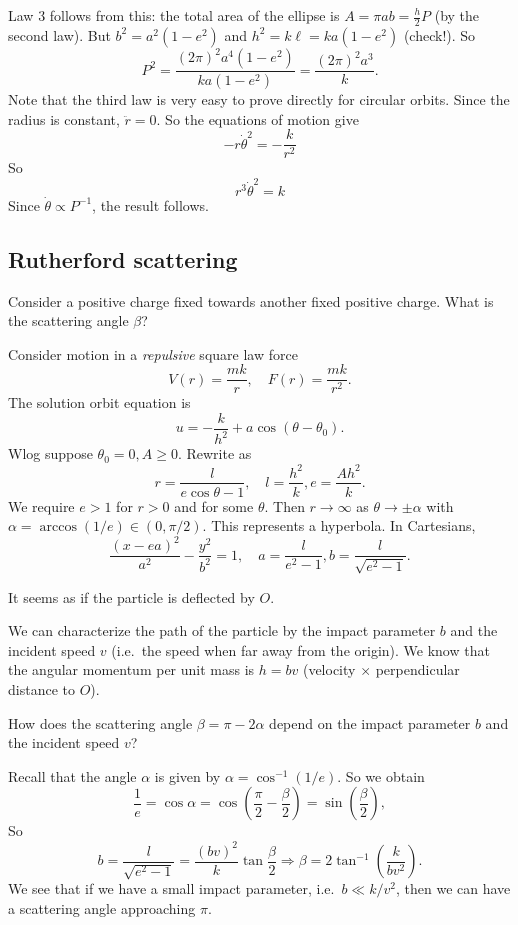 Law 3 follows from this: the total area of the ellipse is $A = \pi ab = \frac{h}{2}P$ (by the second law). But $b^2 = a^2( 1 - e^2)$ and $h^2 = k\ell = ka(1 - e^2)$ (check!). So
\[
  P^2 = \frac{(2\pi)^2a^4(1 - e^2)}{ka(1 - e^2)} = \frac{(2\pi)^2 a^3}{k}.
\]
Note that the third law is very easy to prove directly for circular orbits. Since the radius is constant, $\ddot{r} = 0$. So the equations of motion give
\[
  -r \dot{\theta}^2 = -\frac{k}{r^2}
\]
So
\[
  r^3 \dot{\theta}^2 = k
\]
Since $\dot{\theta}\propto P^{-1}$, the result follows.
\subsection{Rutherford scattering}

Consider a positive charge fixed towards another fixed positive charge. What is the scattering angle $ \beta $?

Consider motion in a \textit{repulsive} square law force
\[
    V(r) = \frac{mk}{r},\quad F(r) = \frac{mk}{r^2}.
\]
The solution orbit equation is 
\[
    u = -\frac{k}{h^2}+ a \cos (\theta-\theta_0).
\]
Wlog suppose $ \theta_0=0,A\ge 0 $. Rewrite as 
\[
    r = \frac{l}{e\cos \theta-1 },\quad l=\frac{h^2}{k},e=\frac{Ah^2}{k}.
\]
We require $ e>1 $ for $r>0$ and for some $ \theta $. Then $ r\to \infty $ as $ \theta\to \pm \alpha $ with $ \alpha=\arccos (1/e)\in (0,\pi/2) $. This represents a hyperbola. In Cartesians,
\[
    \frac{(x-ea)^2}{a^2}-\frac{y^2}{b^2}=1,\quad a=\frac{l}{e^2-1},b=\frac{l}{\sqrt{e^2-1}}.
\]
\begin{center}
\end{center}
It seems as if the particle is deflected by $O$.

We can characterize the path of the particle by the impact parameter $b$ and the incident speed $v$ (i.e.\ the speed when far away from the origin). We know that the angular momentum per unit mass is $h = bv$ (velocity $\times$ perpendicular distance to $O$).

How does the scattering angle $\beta = \pi - 2\alpha$ depend on the impact parameter $b$ and the incident speed $v$?

Recall that the angle $\alpha$ is given by $\alpha = \cos^{-1} (1/e)$. So we obtain
\[
  \frac{1}{e} = \cos \alpha = \cos \left(\frac{\pi}{2} - \frac{\beta}{2}\right) = \sin\left(\frac{\beta}{2}\right),
\]
So
\[
  b = \frac{l}{\sqrt{e^2 - 1}} = \frac{(bv)^2}{k}\tan \frac{\beta}{2}\Longrightarrow \beta = 2\tan^{-1}\left(\frac{k}{bv^2}\right).
\]
We see that if we have a small impact parameter, i.e.\ $b \ll k/v^2$, then we can have a scattering angle approaching $\pi$.